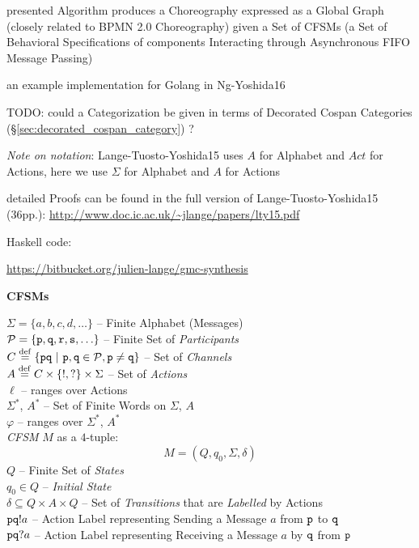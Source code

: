 presented Algorithm produces a Choreography expressed as a Global Graph
(closely related to BPMN 2.0 Choreography) given a Set of CFSMs (a Set
of Behavioral Specifications of components Interacting through
Asynchronous FIFO Message Passing)

\fist an example implementation for Golang in Ng-Yoshida16

TODO: could a Categorization be given in terms of Decorated Cospan
Categories (\S\ref{sec:decorated_cospan_category}) ?

\asterism

\emph{Note on notation}: Lange-Tuosto-Yoshida15 uses $A$ for
Alphabet and $Act$ for Actions, here we use $\Sigma$ for Alphabet and
$A$ for Actions

detailed Proofs can be found in the full version of
Lange-Tuosto-Yoshida15 (36pp.):
\url{http://www.doc.ic.ac.uk/~jlange/papers/lty15.pdf}

Haskell code:

\url{https://bitbucket.org/julien-lange/gmc-synthesis}


\textbf{CFSMs}

$\Sigma = \{ a,b,c,d,\ldots \}$ -- Finite Alphabet (Messages) \\
$\mathcal{P} = \{ \mathtt{p, q, r, s},\ldots\}$
-- Finite Set of \emph{Participants} \\
$C \stackrel{\mathrm{def}}= \{ \mathtt{pq}
  \ |\ \mathtt{p,q} \in \mathcal{P}, \mathtt{p \neq q} \}$
-- Set of \emph{Channels} \\
$A \stackrel{\mathrm{def}}= C \times \{!,?\} \times \Sigma$ -- Set of \emph{Actions} \\
$\ell$ -- ranges over Actions \\
$\Sigma^*$, $A^*$ -- Set of Finite Words on $\Sigma$, $A$ \\
$\varphi$ -- ranges over $\Sigma^*$, $A^*$ \\

\emph{CFSM} $M$ as a $4$-tuple:
\[
  M = (Q, q_0, \Sigma, \delta)
\]
$Q$ -- Finite Set of \emph{States} \\
$q_0 \in Q$ -- \emph{Initial State} \\
$\delta \subseteq Q \times A \times Q$ -- Set of \emph{Transitions}
that are \emph{Labelled} by Actions \\

$\mathtt{pq}!a$ -- Action Label representing Sending a Message $a$ from
$\mathtt{p}$ to $\mathtt{q}$ \\
$\mathtt{pq}?a$ -- Action Label representing Receiving a Message $a$ by
$\mathtt{q}$ from $\mathtt{p}$

